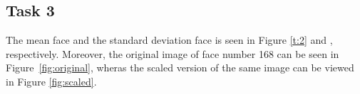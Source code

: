 \documentclass[a4paper,10pt]{article}
\begin{document}
\subsection{Task 3}
The mean face and the standard deviation face is seen in
Figure {\ref{t:2}} \protect {} and \protect
{}, respectively. Moreover,
the original image of face number 168 can be seen in
Figure {\ref{fig:original}}, wheras the scaled version
of the same image can be viewed in Figure {\ref{fig:scaled}}.
\begin{figure}[H]
   \\
\end{figure}
\end{document}
